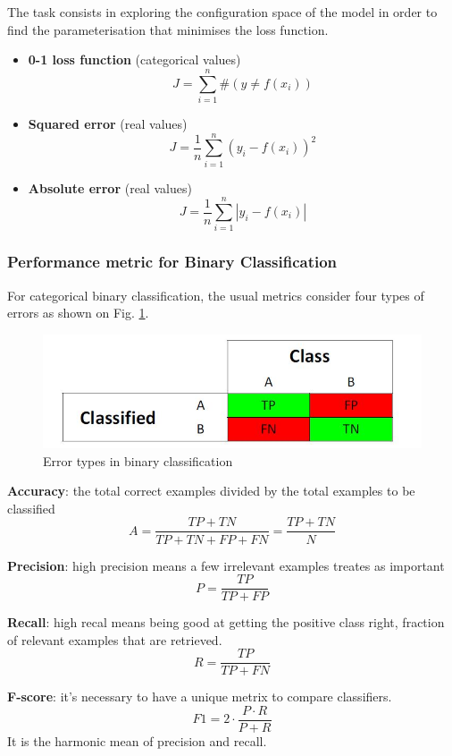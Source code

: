 The task consists in exploring the configuration space of the model in order to find the parameterisation that minimises the loss function.

\begin{itemize}
 	\item \textbf{0-1 loss function} (categorical values)
 	$$ J = \sum_{i = 1}^n \#(y \neq f(x_i)) $$
 	\item \textbf{Squared error} (real values)
 	$$ J = \frac{1}{n} \sum_{i = 1}^n (y_i - f(x_i))^2 $$
 	\item \textbf{Absolute error} (real values)
 	$$ J = \frac{1}{n} \sum_{i = 1}^n |y_i - f(x_i)| $$
 \end{itemize} 

\subsubsection*{Performance metric for Binary Classification}
For categorical binary classification, the usual metrics consider four types of errors as shown on Fig. \ref{fig:binClass}.\\

\begin{figure}[!ht]
  \centering
  \includegraphics[width=1.0\linewidth]{figures/binary_class}
  \caption{Error types in binary classification}
  \label{fig:binClass}
\end{figure}

\textbf{Accuracy}: the total correct examples divided by the total examples to be classified
$$ A = \frac{TP + TN}{TP + TN + FP + FN} = \frac{TP + TN}{N}$$

\textbf{Precision}: high precision means a few irrelevant examples treates as important
$$ P = \frac{TP}{TP + FP} $$

\textbf{Recall}: high recal means being good at getting the positive class right, fraction of relevant examples that are retrieved.
$$ R = \frac{TP}{TP + FN} $$

\textbf{F-score}: it's necessary to have a unique metrix to compare classifiers.
$$ F1 = 2 \cdot \frac{P \cdot R}{P + R} $$
It is the harmonic mean of precision and recall.

